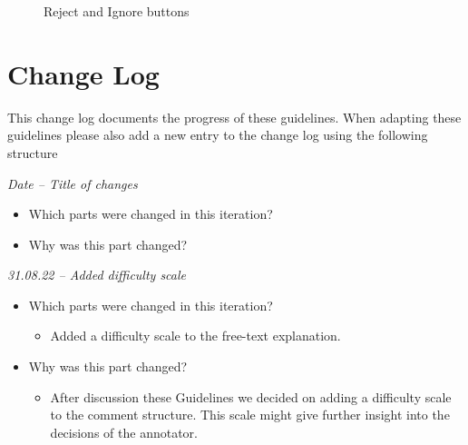 \documentclass{article}
\begin{document}
\begin{figure}[H]
     \caption{Reject and Ignore buttons}
     \label{reject_ignore}
\end{figure}

\pagebreak
\section{Change Log}
This change log documents the progress of these guidelines. When adapting these guidelines please also add a new entry to the change log using the following structure
\begin{mdframed}[frametitle={Template}]
\emph{Date – Title of changes}
\begin{itemize}
	\item Which parts were changed in this iteration?
    \item Why was this part changed?
\end{itemize}
\end{mdframed}
\begin{mdframed}[frametitle={Change Log}]
\emph{31.08.22 – Added difficulty scale}
\begin{itemize}
	\item Which parts were changed in this iteration?
	\begin{itemize}
	\item Added a difficulty scale to the free-text explanation.
	\end{itemize}
    \item Why was this part changed?
    \begin{itemize}
	\item After discussion these Guidelines we decided on adding a difficulty scale to the comment structure. This scale might give further insight into the decisions of the annotator.
	\end{itemize}
\end{itemize}
\end{mdframed}



\pagebreak

\listoffigures
\end{document}
